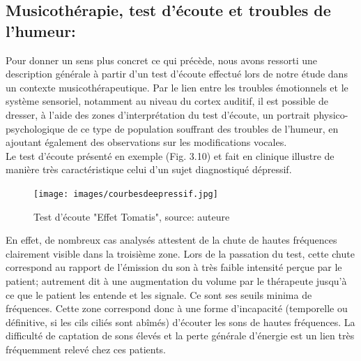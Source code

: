 \subsection{Musicothérapie, test d'écoute et troubles de l'humeur:}
Pour donner un sens plus concret ce qui précède, nous avons ressorti une description 
générale à partir d'un test d'écoute effectué lors de notre étude dans un contexte musicothérapeutique.
Par le lien entre les troubles
émotionnels et le
système sensoriel, notamment au niveau du cortex auditif, il est 
possible de dresser, à l'aide des zones d'interprétation du test d'écoute, un portrait 
physico-psychologique de ce type de population souffrant des troubles de l'humeur, 
en ajoutant également des observations sur les modifications vocales.
	\\
Le test d'écoute présenté en exemple (Fig. 3.10) et fait en clinique illustre de 
manière très 
caractéristique celui d'un sujet diagnostiqué dépressif.
\begin{figure}[ht]
	\centering
	\texttt{[image: images/courbesdeepressif.jpg]}
	\caption{Test d'écoute "Effet Tomatis", source: auteure}
	\label{fig:courbes du dépressif}
\end{figure}
En effet, de nombreux cas analysés attestent de la 
chute de hautes fréquences 
clairement visible dans la troisième zone. Lors de la passation du test, cette chute correspond au rapport 
de 
l'émission du son à
très faible intensité perçue par le
patient;  autrement dit à une augmentation
du volume
par le thérapeute jusqu'à ce que le patient les entende et les signale.
Ce sont ses seuils minima de fréquences.
Cette zone correspond donc à une forme d'incapacité (temporelle ou définitive, si les cils ciliés sont 
abîmés) d'écouter les sons de 
hautes fréquences. La
difficulté de captation de sons élevés et  la perte générale d'énergie est un lien très 
fréquemment relevé chez ces patients. %



